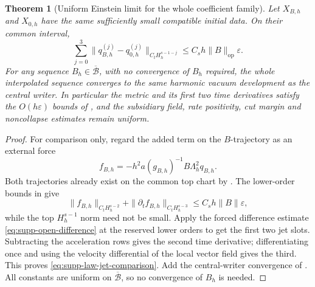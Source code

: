 \documentclass[11pt]{article}
\newtheorem{theorem}{Theorem}[section]
\numberwithin{equation}{section}
\theoremstyle{definition}
\theoremstyle{remark}
\newcommand{\op}{\mathrm{op}}
\begin{document}
\begin{theorem}[Uniform Einstein limit for the whole coefficient family]
\label{thm:supp-law-einstein}
Let $X_{B,h}$ and $X_{0,h}$ have the same sufficiently small compatible
initial data.  On their common interval,
\begin{equation}
 \sum_{j=0}^3
 \|q_{B,h}^{(j)}-q_{0,h}^{(j)}\|_{C_tH_h^{s-1-j}}
       \le C_sh\|B\|_{\op}\varepsilon.
 \label{eq:supp-law-jet-comparison}
\end{equation}
For any sequence $B_h\in\overline{\mathcal B}$, with no convergence of $B_h$
required, the whole interpolated sequence converges to the same harmonic
vacuum development as the central writer.  In particular the metric and its
first two time derivatives satisfy the $O(h\varepsilon)$ bounds of
, and the subsidiary field, rate positivity,
cut margin and noncollapse estimates remain uniform.
\end{theorem}
\begin{proof}
For comparison only, regard the added term on the $B$-trajectory as an
external force
\[
 f_{B,h}=-h^2a(g_{B,h})^{-1}B\Lambda_h^2q_{B,h}.
\]
Both trajectories already exist on the common top chart by
.  The lower-order bounds in
 give
\[
 \|f_{B,h}\|_{C_tH_h^{s-2}}
 +\|\partial_tf_{B,h}\|_{C_tH_h^{s-3}}
 \le C_sh\|B\|\varepsilon,
\]
while the top $H_h^{s-1}$ norm need not be small.  Apply the forced difference
estimate \eqref{eq:supp-open-difference} at the reserved lower orders to get
the first two jet slots.  Subtracting the acceleration rows gives the second
time derivative; differentiating once and using the velocity differential of
the local vector field gives the third.  This proves
\eqref{eq:supp-law-jet-comparison}.  Add the central-writer convergence of
.  All constants are uniform on
$\overline{\mathcal B}$, so no convergence of $B_h$ is needed.
\end{proof}
\end{document}
